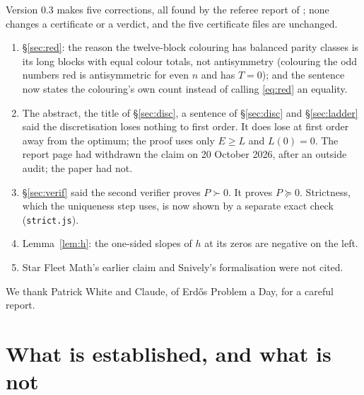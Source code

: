 \documentclass[11pt]{article}
\begin{document}
Version 0.3 makes five corrections, all found by the referee report of \cite{EPAD}; none changes a certificate or a verdict, and the five certificate files are unchanged.
\begin{enumerate}
\item \S\ref{sec:red}: the reason the twelve-block colouring has balanced parity classes is its long blocks with equal colour totals, not antisymmetry (colouring the odd numbers red is antisymmetric for even $n$ and has $T=0$); and the sentence now states the colouring's own count instead of calling \eqref{eq:red} an equality.
\item The abstract, the title of \S\ref{sec:disc}, a sentence of \S\ref{sec:disc} and \S\ref{sec:ladder} said the discretisation loses nothing to first order. It does lose at first order away from the optimum; the proof uses only $E\ge L$ and $L(0)=0$. The report page had withdrawn the claim on 20 October 2026, after an outside audit; the paper had not.
\item \S\ref{sec:verif} said the second verifier proves $P\succ0$. It proves $P\succeq0$. Strictness, which the uniqueness step uses, is now shown by a separate exact check (\texttt{strict.js}).
\item Lemma~\ref{lem:h}: the one-sided slopes of $h$ at its zeros are negative on the left.
\item Star Fleet Math's earlier claim \cite{SFM} and Snively's formalisation \cite{Sn} were not cited.
\end{enumerate}
We thank Patrick White and Claude, of Erd\H{o}s Problem a Day, for a careful report.

\section{What is established, and what is not}\label{sec:limits}
\end{document}
